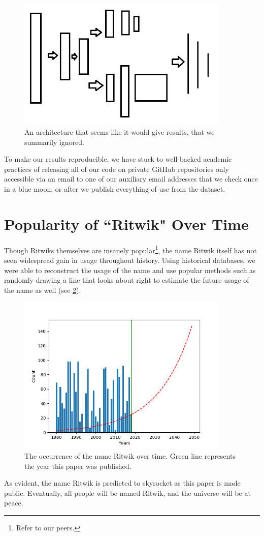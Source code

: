 \documentclass[]{article}
\begin{document}
\begin{figure}[h]
	\centering
	\includegraphics[width=4in]{figures/Neuralnet}
	\caption{An architecture that seems like it would give results, that we summarily ignored.}
	\label{fig:neuralnet}
\end{figure}

To make our results reproducible, we have stuck to well-backed academic practices of releasing all of our code on private GitHub repositories only accessible via an email to one of our auxiliary email addresses that we check once in a blue moon, or after we publish everything of use from the dataset.

\section{Popularity of ``Ritwik" Over Time}
Though Ritwiks themselves are insanely popular\footnote{Refer to our peers.}, the name Ritwik itself has not seen widespread gain in usage throughout history. Using historical databases, we were able to reconstruct the usage of the name and use popular methods such as randomly drawing a line that looks about right to estimate the future usage of the name as well (see \ref{fig:usageofritwik}).
\begin{figure}[h]
	\centering
	\includegraphics[width=4in]{figures/UsageOfRitwik}
	\caption{The occurrence of the name Ritwik over time. Green line represents the year this paper was published.}
	\label{fig:usageofritwik}
\end{figure}
As evident, the name Ritwik is predicted to skyrocket as this paper is made public. Eventually, all people will be named Ritwik, and the universe will be at peace.
\end{document}
